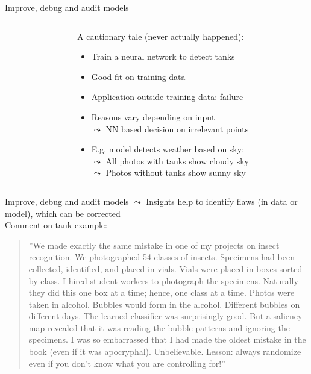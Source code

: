 \documentclass[11pt,compress,t,notes=noshow, aspectratio=169, xcolor=table]{beamer}
\begin{document}
\begin{frame}{Improve, debug and audit models}
\begin{columns}[T, totalwidth = \textwidth]
\begin{column}{0.44\textwidth}
	\end{column}
	\begin{column}{0.56\textwidth}
    A cautionary tale (never actually happened):
	\begin{itemize}
	    \item Train a neural network to detect tanks
        \item Good fit on training data
        \item Application outside training data: failure
        \item<2-> Reasons vary depending on input\\
        $\leadsto$ NN based decision on irrelevant points
        \item<3-> E.g. model detects weather based on sky:\\
        $\leadsto$ All photos with tanks show cloudy sky\\
        $\leadsto$ Photos without tanks show sunny sky
	\end{itemize}

	\end{column}
	\end{columns}

\end{frame}

\begin{frame}{Improve, debug and audit models}
$\leadsto$ Insights help to identify flaws (in data or model), which can be corrected \\
\vspace{0.9cm}
	\centering
    Comment on tank example: \\
    \medskip
    \begin{quote}
        ''We made exactly the same mistake in one of my projects on insect recognition. We photographed 54 classes of insects. Specimens had been collected, identified, and placed in vials. Vials were placed in boxes sorted by class. I hired student workers to photograph the specimens. Naturally they did this one box at a time; hence, one class at a time. Photos were taken in alcohol. Bubbles would form in the alcohol. Different bubbles on different days. The learned classifier was surprisingly good. But a saliency map revealed that it was reading the bubble patterns and ignoring the specimens. I was so embarrassed that I had made the oldest mistake in the book (even if it was apocryphal). Unbelievable. Lesson: always randomize even if you don’t know what you are controlling for!''
    \end{quote}
 \end{frame}
\end{document}
